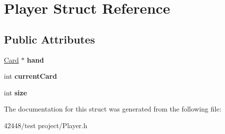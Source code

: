 \hypertarget{struct_player}{\section{Player Struct Reference}
\label{struct_player}
}
\subsection*{Public Attributes}
\begin{DoxyCompactItemize}
\item 
\hypertarget{struct_player_a76b396363177e846d8441b0e8142366e}{\hyperlink{class_card}{Card} $\ast$ {\bfseries hand}}\label{struct_player_a76b396363177e846d8441b0e8142366e}

\item 
\hypertarget{struct_player_aca9b05895c17bda88a942842b106d153}{int {\bfseries current\-Card}}\label{struct_player_aca9b05895c17bda88a942842b106d153}

\item 
\hypertarget{struct_player_a002270b4acd57124f20fb4d5d9d29717}{int {\bfseries size}}\label{struct_player_a002270b4acd57124f20fb4d5d9d29717}

\end{DoxyCompactItemize}


The documentation for this struct was generated from the following file\-:\begin{DoxyCompactItemize}
\item 
42448/test project/Player.\-h\end{DoxyCompactItemize}
